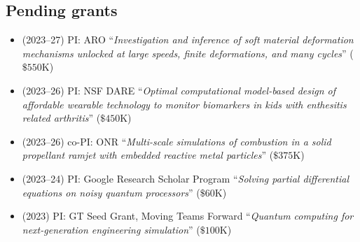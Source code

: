 \subsection{Pending grants}

\begin{itemize}
    \item (2023--27) PI: ARO ``\textit{Investigation and inference of soft material deformation mechanisms unlocked at large speeds, finite deformations, and many cycles}'' ($\$550$K)
    \item (2023--26) PI: NSF DARE ``\textit{Optimal computational model-based design of affordable wearable technology to monitor biomarkers in kids with enthesitis related arthritis}'' ($\$450$K)
    \item (2023--26) co-PI: ONR ``\textit{Multi-scale simulations of combustion in a solid propellant ramjet with embedded reactive metal particles}'' ($\$375$K)
    \item (2023--24) PI: Google Research Scholar Program ``\textit{Solving partial differential equations on noisy quantum processors}'' ($\$60$K)
    \item (2023) PI: GT Seed Grant, Moving Teams Forward ``\textit{Quantum computing for next-generation engineering simulation}'' ($\$100$K)
\end{itemize}
